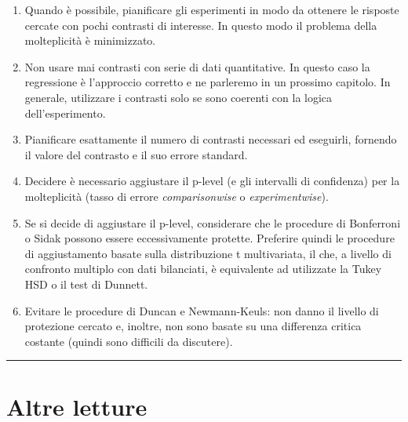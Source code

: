 \documentclass[a4paper,12pt,oneside]{book}
\providecommand{\tightlist}{%
  \setlength{\itemsep}{0pt}\setlength{\parskip}{0pt}}
\begin{document}
\begin{enumerate}
\def\labelenumi{\arabic{enumi}.}
\tightlist
\item
  Quando è possibile, pianificare gli esperimenti in modo da ottenere le risposte cercate con pochi contrasti di interesse. In questo modo il problema della molteplicità è minimizzato.
\item
  Non usare mai contrasti con serie di dati quantitative. In questo caso la regressione è l'approccio corretto e ne parleremo in un prossimo capitolo. In generale, utilizzare i contrasti solo se sono coerenti con la logica dell'esperimento.
\item
  Pianificare esattamente il numero di contrasti necessari ed eseguirli, fornendo il valore del contrasto e il suo errore standard.
\item
  Decidere è necessario aggiustare il p-level (e gli intervalli di confidenza) per la molteplicità (tasso di errore \emph{comparisonwise} o \emph{experimentwise}).
\item
  Se si decide di aggiustare il p-level, considerare che le procedure di Bonferroni o Sidak possono essere eccessivamente protette. Preferire quindi le procedure di aggiustamento basate sulla distribuzione t multivariata, il che, a livello di confronto multiplo con dati bilanciati, è equivalente ad utilizzate la Tukey HSD o il test di Dunnett.
\item
  Evitare le procedure di Duncan e Newmann-Keuls: non danno il livello di protezione cercato e, inoltre, non sono basate su una differenza critica costante (quindi sono difficili da discutere).
\end{enumerate}

\begin{center}\rule{0.5\linewidth}{0.5pt}\end{center}

\hypertarget{altre-letture-8}{%
\section{Altre letture}\label{altre-letture-8}}
\end{document}
